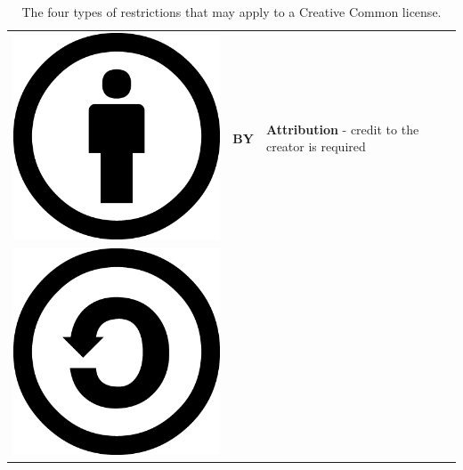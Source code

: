 \begin{table}[]
\centering
\caption{ The four types of restrictions that may apply to a Creative Common license.}
\label{table_5}
\begin{tabular}{ p{1cm} p{1cm} p{10cm}}
    \begin{minipage}{.1\textwidth}
      \includegraphics[scale=.07]{images/cc_by.png}
    \end{minipage} & \textbf{BY} & \textbf{Attribution} - credit to the creator is required                                                                                                             
    \\
 \begin{minipage}{.1\textwidth}
      \includegraphics[scale=.07]{images/cc_sa.png}

\end{minipage}
\end{tabular}
\end{table}
